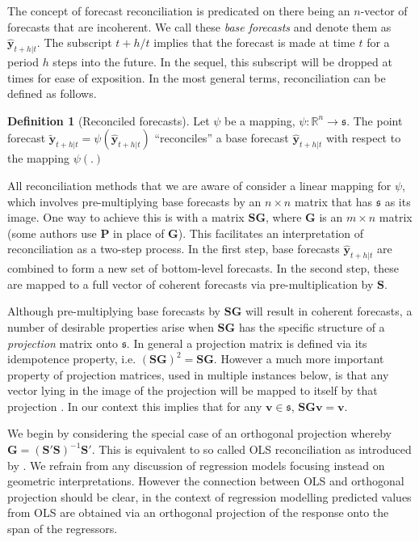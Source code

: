 \documentclass[12pt]{article}
\theoremstyle{definition}
\newtheorem{definition}{Definition}[section]
\begin{document}
	The concept of forecast reconciliation is predicated on there being an $n$-vector of forecasts that are incoherent.  We call these {\em base forecasts} and denote them as $\hat{\bm{y}}_{t+h|t}$. The subscript $t+h/t$ implies that the forecast is made at time $t$ for a period $h$ steps into the future.  In the sequel, this subscript will be dropped at times for ease of exposition.  In the most general terms, reconciliation can be defined as follows.
	
	\begin{definition}[Reconciled forecasts]\label{def:reconpoint}
		Let $\psi$ be a mapping, $\psi:\mathbb{R}^n\rightarrow\mathfrak{s}$.  The point forecast $\tilde{\bm{y}}_{t+h|t}=\psi\left(\hat{\bm{y}}_{t+h|t}\right)$ ``reconciles'' a base forecast $\hat{\bm{y}}_{t+h|t}$ with respect to the mapping $\psi(.)$
	\end{definition}
	
	All reconciliation methods that we are aware of consider a linear mapping for $\psi$, which involves pre-multiplying base forecasts by an $n\times n$ matrix that has $\mathfrak{s}$ as its image.  One way to achieve this is with a matrix $\bm{SG}$, where $\bm{G}$ is an $m\times n$ matrix  (some authors use $\bm{P}$ in place of $\bm{G}$).  This facilitates an interpretation of reconciliation as a two-step process. In the first step, base forecasts $\hat{\bm{y}}_{t+h|t}$ are combined to form a new set of bottom-level forecasts. In the second step, these are mapped to a full vector of coherent forecasts via pre-multiplication by $\bm{S}$.
	
	Although pre-multiplying base forecasts by $\bm{SG}$ will result in coherent forecasts, a number of desirable properties arise when $\bm{SG}$ has the specific structure of a {\em projection} matrix onto $\mathfrak{s}$.  In general a projection matrix is defined via its idempotence property, i.e. $(\bm{SG})^2=\bm{SG}$.  However a much more important property of projection matrices, used in multiple instances below, is that any vector lying in the image of the projection will be mapped to itself by that projection \citep[see Lemma 2.4 in][for a proof]{rao1974}. In our context this implies that for any $\bm{v}\in\mathfrak{s}$, $\bm{SGv}=\bm{v}$.
	
	We begin by considering the special case of an orthogonal projection whereby $\bm{G}=\left(\bm{S}'\bm{S}\right)^{-1}\bm{S}'$.  This is equivalent to so called OLS reconciliation as introduced by \cite{Hyndman2011}.  We refrain from any discussion of regression models focusing instead on geometric interpretations.  However the connection between OLS and orthogonal projection should be clear, in the context of regression modelling predicted values from OLS are obtained via an orthogonal projection of the response onto the span of the regressors.
	
\end{document}
